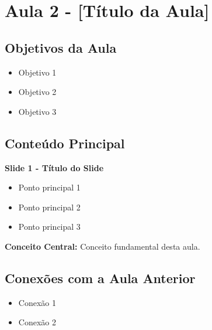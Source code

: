 \pagebreak
\section{Aula 2 - [Título da Aula]}

\subsection{Objetivos da Aula}
\begin{itemize}[leftmargin=*]
    \item Objetivo 1
    \item Objetivo 2
    \item Objetivo 3
\end{itemize}

\subsection{Conteúdo Principal}

\begin{slidecontent}
\textbf{Slide 1 - Título do Slide}
\begin{itemize}
    \item Ponto principal 1
    \item Ponto principal 2
    \item Ponto principal 3
\end{itemize}
\end{slidecontent}

\begin{keypoint}
\textbf{Conceito Central:} Conceito fundamental desta aula.
\end{keypoint}

\subsection{Conexões com a Aula Anterior}
\begin{itemize}[leftmargin=*]
    \item Conexão 1
    \item Conexão 2
\end{itemize}

\sectionbreak